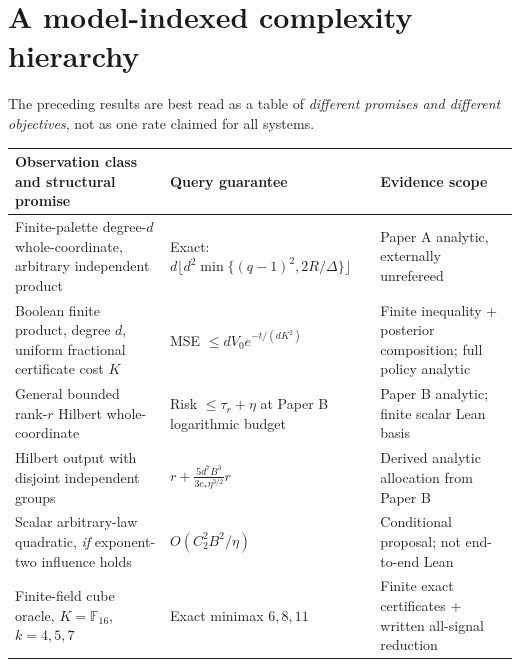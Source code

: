 \documentclass[
  10pt,
]{article}
\begin{document}
\section{A model-indexed complexity
hierarchy}\label{a-model-indexed-complexity-hierarchy}

The preceding results are best read as a table of \emph{different
promises and different objectives}, not as one rate claimed for all
systems.

\begin{longtable}[]{@{}
  >{\raggedright\arraybackslash}p{}
  >{\raggedright\arraybackslash}p{}
  >{\raggedright\arraybackslash}p{}@{}}
\toprule\noalign{}
\begin{minipage}[b]{\linewidth}\raggedright
Observation class and structural promise
\end{minipage} & \begin{minipage}[b]{\linewidth}\raggedright
Query guarantee
\end{minipage} & \begin{minipage}[b]{\linewidth}\raggedright
Evidence scope
\end{minipage} \\
\midrule\noalign{}
\endhead
\bottomrule\noalign{}
\endlastfoot
Finite-palette degree-\(d\) whole-coordinate, arbitrary independent
product & Exact: \(d\lfloor d^2\min\{(q-1)^2,2R/\Delta\}\rfloor\) &
Paper A analytic, externally unrefereed \\
Boolean finite product, degree \(d\), uniform fractional certificate
cost \(K\) & MSE \(\le dV_0e^{-t/(dK^2)}\) & Finite inequality +
posterior composition; full policy analytic \\
General bounded rank-\(r\) Hilbert whole-coordinate & Risk
\(\le\tau_r+\eta\) at Paper B logarithmic budget & Paper B analytic;
finite scalar Lean basis \\
Hilbert output with disjoint independent groups &
\(r+\tfrac{5d^7B^3}{3c_*\eta^{3/2}}r\) & Derived analytic allocation
from Paper B \\
Scalar arbitrary-law quadratic, \emph{if} exponent-two influence holds &
\(O(C_2^2B^2/\eta)\) & Conditional proposal; not end-to-end Lean \\
Finite-field cube oracle, \(K=\mathbb F_{16}\), \(k=4,5,7\) & Exact
minimax \(6,8,11\) & Finite exact certificates + written all-signal
reduction \\
\end{longtable}
\end{document}
